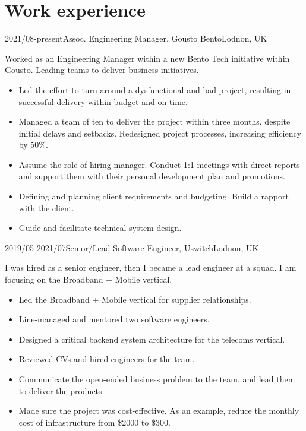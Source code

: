 \documentclass[a4paper]{twentysecondcv-english} %
\begin{document}
\section{Work experience}

\begin{twenty}
	\twentyitem
	    {2021/08-present}{Assoc. Engineering Manager, Gousto Bento}{Lodnon, UK}
    	{Worked as an Engineering Manager within a new Bento Tech initiative within Gousto. Leading teams to deliver business initiatives.
        	\begin{itemize}
                \item Led the effort to turn around a dysfunctional and bad project, resulting in successful delivery within budget and on time.
                \item Managed a team of ten to deliver the project within three months, despite initial delays and setbacks. Redesigned project processes, increasing efficiency by 50\%.
                \item Assume the role of hiring manager. Conduct 1:1 meetings with direct reports and support them with their personal development plan and promotions.
                \item Defining and planning client requirements and budgeting. Build a rapport with the client.
                \item Guide and facilitate technical system design.
            \end{itemize}}
	\twentyitem
	    {2019/05-2021/07}{Senior/Lead Software Engineer, Uswitch}{Lodnon, UK}
    	{I was hired as a senior engineer, then I became a lead engineer at a squad. I am focusing on the Broadband + Mobile vertical.
        	\begin{itemize}
                \item Led the Broadband + Mobile vertical for supplier relationships.
                \item Line-managed and mentored two software engineers.
                \item Designed a critical backend system architecture for the telecoms vertical.
                \item Reviewed CVs and hired engineers for the team.
                \item Communicate the open-ended business problem to the team, and lead them to deliver the products.
                \item Made sure the project was cost-effective. As an example, reduce the monthly cost of infrastructure from \$2000 to \$300.

\end{itemize}}
\end{twenty}
\end{document}
